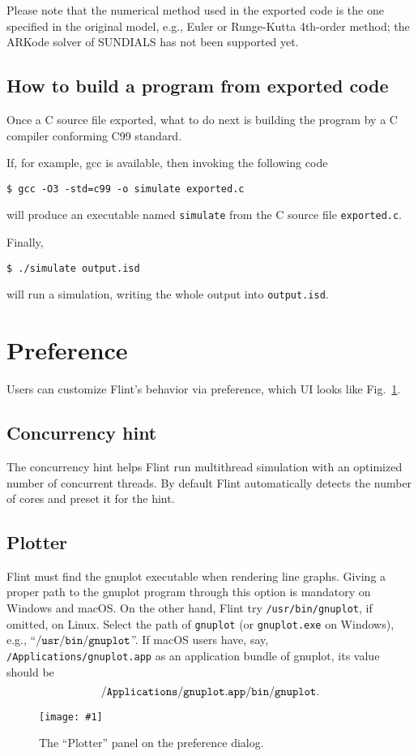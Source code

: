 \documentclass[a4paper,10pt]{report}
\newcommand{\filename}[1]{{\tt #1}}
\newcommand\FigureOfImage[2]{\begin{figure}[h]
  \centering
  \texttt{[image: \#1]}
  \caption{#2}\label{fig:#1}
\end{figure}}
\begin{document}
Please note that the numerical method used in the exported code is the one
specified in the original model, e.g., Euler or Runge-Kutta 4th-order method;
the ARKode solver of SUNDIALS has not been supported yet.

\subsection{How to build a program from exported code}
Once a C source file exported, what to do next is building the program by a C compiler
conforming C99 standard.

If, for example, gcc is available, then invoking the following code
\begin{verbatim}
$ gcc -O3 -std=c99 -o simulate exported.c
\end{verbatim}
will produce an executable named {\tt simulate} from the C source file {\tt exported.c}.

Finally,
\begin{verbatim}
$ ./simulate output.isd
\end{verbatim}
will run a simulation, writing the whole output into {\tt output.isd}.

\section{Preference}
\label{sec:preference}
Users can customize Flint's behavior via preference, which UI looks like
Fig.~\ref{fig:preference-plotter}.

\subsection{Concurrency hint}
The concurrency hint helps Flint run multithread simulation with an optimized number
of concurrent threads. By default Flint automatically detects the number of cores and
preset it for the hint.

\subsection{Plotter}
Flint must find the gnuplot executable when rendering line graphs.
Giving a proper path to the gnuplot program through this option is mandatory on
Windows and macOS. On the other hand, Flint try \filename{/usr/bin/gnuplot}, if
omitted, on Linux.
Select the path of {\tt gnuplot} (or {\tt gnuplot.exe} on Windows), e.g.,
``$\tt{/usr/bin/gnuplot}$''. If macOS users have, say,
{\tt /Applications/gnuplot.app} as an application bundle of gnuplot,
its value should be \[{\tt /Applications/gnuplot.app/bin/gnuplot}.\]
\FigureOfImage{preference-plotter}{The ``Plotter'' panel on the preference dialog.}
\end{document}
